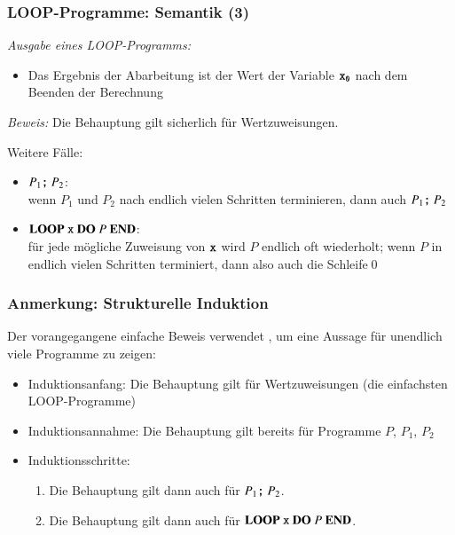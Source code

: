 \documentclass[onlymath]{beamer}
\begin{document}
\begin{frame}\frametitle{LOOP-Programme: Semantik (3)}

\emph{Ausgabe eines LOOP-Programms:}\\
\begin{itemize}
\item Das Ergebnis der Abarbeitung ist der Wert der Variable $\texttt{x}_{\texttt{0}}$ nach dem Beenden der Berechnung
\end{itemize}
\bigskip\pause


\pause
\emph{Beweis:} Die Behauptung gilt sicherlich für Wertzuweisungen.
\bigskip

Weitere Fälle:
\begin{itemize}
\item $P_1\texttt{;}{}~P_2$:\\
	wenn $P_1$ und $P_2$ nach endlich vielen Schritten terminieren, dann auch $P_1\texttt{;}{}~P_2$
\item $\textbf{LOOP}~\texttt{x}~\textbf{DO}~P~\textbf{END}{}$:\\
	für jede mögliche Zuweisung von $\texttt{x}$ wird $P$ endlich oft wiederholt;
	wenn $P$ in endlich vielen Schritten terminiert, dann also auch die Schleife\qed
\end{itemize}

\end{frame}

\begin{frame}\frametitle{Anmerkung: Strukturelle Induktion}

Der vorangegangene einfache Beweis verwendet , um eine
Aussage für unendlich viele Programme zu zeigen:
\begin{itemize}
\item \alert{Induktionsanfang:} Die Behauptung gilt für Wertzuweisungen (die einfachsten LOOP-Programme)
\item \alert{Induktionsannahme:} Die Behauptung gilt bereits für Programme $P$, $P_1$, $P_2$
\item \alert{Induktionsschritte:}
\begin{enumerate}[(1)]
\item Die Behauptung gilt dann auch für $P_1\texttt{;}{}~P_2$.
\item Die Behauptung gilt dann auch für $\textbf{LOOP}~\texttt{x}~\textbf{DO}~P~\textbf{END}{}$.
\end{enumerate}
\end{itemize}
\bigskip


\end{frame}
\end{document}
